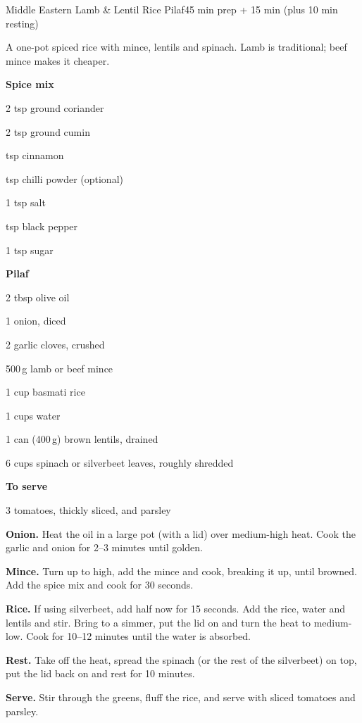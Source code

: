\begin{recipebox}{Middle Eastern Lamb \& Lentil Rice Pilaf}{4}{5 min prep + 15 min (plus 10 min resting)}

A one-pot spiced rice with mince, lentils and spinach. Lamb is traditional; beef
mince makes it cheaper.

\begin{ingredients}
  \item[] \textbf{Spice mix}
  \item 2 tsp ground coriander
  \item 2 tsp ground cumin
  \item {} tsp cinnamon
  \item {} tsp chilli powder (optional)
  \item 1 tsp salt
  \item {} tsp black pepper
  \item 1 tsp sugar
  \item[] \textbf{Pilaf}
  \item 2 tbsp olive oil
  \item 1 onion, diced
  \item 2 garlic cloves, crushed
  \item 500\,g lamb or beef mince
  \item 1 cup basmati rice
  \item 1 cups water
  \item 1 can (400\,g) brown lentils, drained
  \item 6 cups spinach or silverbeet leaves, roughly shredded
  \item[] \textbf{To serve}
  \item 3 tomatoes, thickly sliced, and parsley
\end{ingredients}

\begin{method}
  \item \textbf{Onion.} Heat the oil in a large pot (with a lid) over medium-high
        heat. Cook the garlic and onion for 2--3 minutes until golden.
  \item \textbf{Mince.} Turn up to high, add the mince and cook, breaking it up,
        until browned. Add the spice mix and cook for 30 seconds.
  \item \textbf{Rice.} If using silverbeet, add half now for 15 seconds. Add the
        rice, water and lentils and stir. Bring to a simmer, put the lid on and
        turn the heat to medium-low. Cook for 10--12 minutes until the water is
        absorbed.
  \item \textbf{Rest.} Take off the heat, spread the spinach (or the rest of the
        silverbeet) on top, put the lid back on and rest for 10 minutes.
  \item \textbf{Serve.} Stir through the greens, fluff the rice, and serve with
        sliced tomatoes and parsley.
\end{method}


\end{recipebox}
